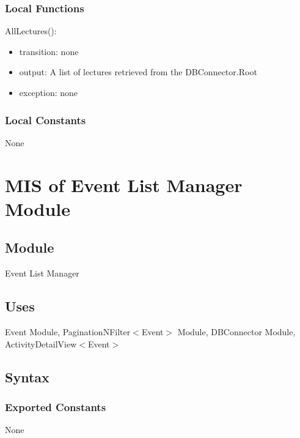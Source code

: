 \documentclass[12pt, titlepage]{article}
\begin{document}
\subsubsection{Local Functions}

\noindent AllLectures():
\begin{itemize}
\item transition: none
\item output: A list of lectures retrieved from the DBConnector.Root
\item exception: none
\end{itemize}

\subsubsection{Local Constants}

None

\newpage

\section{MIS of Event List Manager Module} \label{mEL}

\subsection{Module}

Event List Manager

\subsection{Uses}

Event Module, PaginationNFilter$<$Event$>$ Module, DBConnector Module,\\ ActivityDetailView$<$Event$>$

\subsection{Syntax}

\subsubsection{Exported Constants}
None
\end{document}
